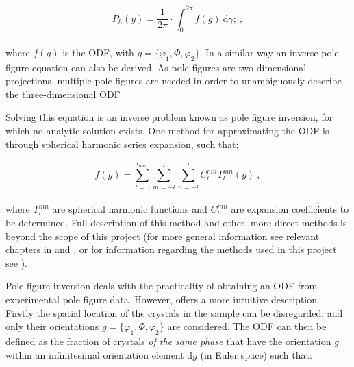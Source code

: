 \documentclass[a4paper,12pt,twoside]{report}
\numberwithin{equation}{chapter}
\begin{document}
\begin{equation} \label{eq:pole_figures}
P_h(y) = \frac{1}{2\pi} \cdot \int_{0}^{2\pi}f(g)\ \mathrm{d}\gamma;\ ,
\end{equation}
\\
where $f(g)$ is the ODF, with $g = \{\varphi_1,\Phi,\varphi_2\}$. In a similar way an inverse pole figure equation can also be derived. As pole figures are two-dimensional projections, multiple pole figures are needed in order to unambiguously describe the three-dimensional ODF \citep[and in fact it is only determined uniquely for an infinite number of pole figures,][]{Bunge1985}.



Solving this equation is an inverse problem known as pole figure inversion, for which no analytic solution exists. One method for approximating the ODF is through spherical harmonic series expansion, such that;




\begin{equation} \label{eq:series_exp}
f(g) = \sum_{l=0}^{l_{max}} \sum_{m=-l}^l \sum_{n=-l}^l C_l^{mn} T_l^{mn} (g) \ ,
\end{equation}
\\
where $T_l^{mn}$ are spherical harmonic functions and $C_l^{mn}$ are expansion coefficients to be determined. Full description of this method and other, more direct methods is beyond the scope of this project (for more general information see relevant chapters in \cite{bunge1982texture,Bunge1985} and \cite{Randle2000}, or for information regarding the methods used in this project see \cite{Hielscher2008}).




Pole figure inversion deals with the practicality of obtaining an ODF from experimental pole figure data. However, \cite{bunge1982texture} offers a more intuitive description. Firstly the spatial location of the crystals in the sample can be disregarded, and only their orientations $g = \{\varphi_1,\Phi,\varphi_2\}$ are considered. The ODF can then be defined as the fraction of crystals \emph{of the same phase} that have the orientation $g$ within an infinitesimal orientation element $\mathrm{d}g$ (in Euler space) such that: 
\end{document}
